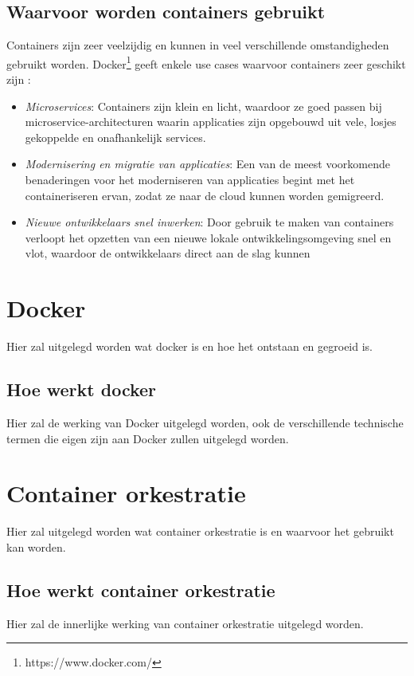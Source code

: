 \subsection{Waarvoor worden containers gebruikt}
Containers zijn zeer veelzijdig en kunnen in veel verschillende omstandigheden gebruikt worden. Docker\footnote{https://www.docker.com/} geeft enkele use cases waarvoor containers zeer geschikt zijn \autocite{Docker2021} :

\begin{itemize}
  \item \textit{Microservices}: Containers zijn klein en licht, waardoor ze goed passen bij microservice-architecturen waarin applicaties zijn opgebouwd uit vele, losjes gekoppelde en onafhankelijk services.
  \item \textit{Modernisering en migratie van applicaties}: Een van de meest voorkomende benaderingen voor het moderniseren van applicaties begint met het containeriseren ervan, zodat ze naar de cloud kunnen worden gemigreerd.
  \item \textit{Nieuwe ontwikkelaars snel inwerken}: Door gebruik te maken van containers verloopt het opzetten van een nieuwe lokale ontwikkelingsomgeving snel en vlot, waardoor de ontwikkelaars direct aan de slag kunnen
\end{itemize}


\section{Docker}
Hier zal uitgelegd worden wat docker is en hoe het ontstaan en gegroeid is.

\subsection{Hoe werkt docker}
Hier zal de werking van Docker uitgelegd worden, ook de verschillende technische termen die eigen zijn aan Docker zullen uitgelegd worden.

\section{Container orkestratie}
Hier zal uitgelegd worden wat container orkestratie is en waarvoor het gebruikt kan worden.

\subsection{Hoe werkt container orkestratie}
Hier zal de innerlijke werking van container orkestratie uitgelegd worden.


